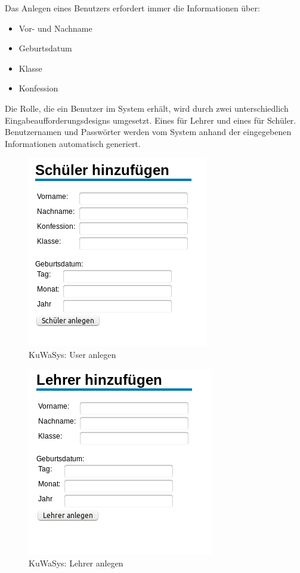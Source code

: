 \documentclass[12pt, twoside, a4paper, ngerman]{article}
\begin{document}
Das Anlegen eines Benutzers erfordert immer die Informationen über:
\begin{itemize}
  \item Vor- und Nachname
  \item Geburtsdatum
  \item Klasse
  \item Konfession
\end{itemize}

Die Rolle, die ein Benutzer im System erhält, wird durch zwei unterschiedlich Eingabeaufforderungsdesigns umgesetzt. Eines für Lehrer und eines für Schüler. Benutzernamen und Passwörter werden vom System anhand der eingegebenen Informationen automatisch generiert. 

\begin{figure}[H]
 \begin{center}
   \includegraphics[scale=0.6]{img/UserAnlegen_KuWaSys.png}
 \end{center}
 \caption[\textbf{KuWaSys: User anlegen}]{KuWaSys: User anlegen}
 \label{fig:UserAnlegen_KuWaSys}
\end{figure}


\begin{figure}[H]
 \begin{center}
   \includegraphics[scale=0.6]{img/LehrerAnlegen_KuWaSys.png}
 \end{center}
 \caption[\textbf{KuWaSys: Lehrer anlegen}]{KuWaSys: Lehrer anlegen}
 \label{fig:LehrerAnlegen_KuWaSys}
\end{figure}
\end{document}
